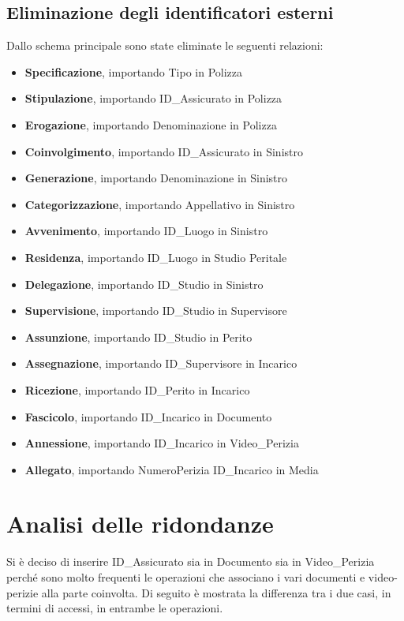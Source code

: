 \documentclass[a4paper,12pt]{report}
\begin{document}
\subsection{Eliminazione degli identificatori esterni}
Dallo schema principale sono state eliminate le seguenti relazioni:
\begin{itemize}
    \item \textbf{Specificazione}, importando Tipo in Polizza
    \item \textbf{Stipulazione}, importando ID\_Assicurato in Polizza
    \item \textbf{Erogazione}, importando Denominazione in Polizza
    \item \textbf{Coinvolgimento}, importando ID\_Assicurato in Sinistro
    \item \textbf{Generazione}, importando Denominazione in Sinistro
    \item \textbf{Categorizzazione}, importando Appellativo in Sinistro
    \item \textbf{Avvenimento}, importando ID\_Luogo in Sinistro
    \item \textbf{Residenza}, importando ID\_Luogo in Studio Peritale
    \item \textbf{Delegazione}, importando ID\_Studio in Sinistro
    \item \textbf{Supervisione}, importando ID\_Studio in Supervisore
    \item \textbf{Assunzione}, importando ID\_Studio in Perito
    \item \textbf{Assegnazione}, importando ID\_Supervisore in Incarico
    \item \textbf{Ricezione}, importando ID\_Perito in Incarico
    \item \textbf{Fascicolo}, importando ID\_Incarico in Documento
    \item \textbf{Annessione}, importando ID\_Incarico in Video\_Perizia
    \item \textbf{Allegato}, importando NumeroPerizia ID\_Incarico in Media
\end{itemize}
\clearpage
\section{Analisi delle ridondanze}
Si è deciso di inserire ID\_Assicurato sia in Documento sia in Video\_Perizia perché sono molto frequenti le operazioni che associano i vari documenti e video-perizie alla parte coinvolta. Di seguito è mostrata la differenza tra i due casi, in termini di accessi, in entrambe le operazioni.
\\
\end{document}
